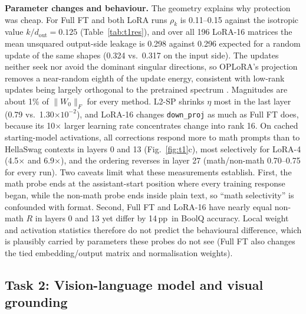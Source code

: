 \documentclass{article}
\newcommand{\pp}{\,pp}
\begin{document}
\textbf{Parameter changes and behaviour.} The geometry explains why protection was cheap. For Full FT and both LoRA runs $\rho_k$ is 0.11--0.15 against the isotropic value $k/d_\text{out}=0.125$ (Table~\ref{tab:t1res}), and over all 196 LoRA-16 matrices the mean unsquared output-side leakage is 0.298 against 0.296 expected for a random update of the same shapes (0.324 vs.\ 0.317 on the input side). The updates neither seek nor avoid the dominant singular directions, so OPLoRA's projection removes a near-random eighth of the update energy, consistent with low-rank updates being largely orthogonal to the pretrained spectrum \citep{shuttleworth2024illusion}. Magnitudes are about 1\% of $\|W_0\|_F$ for every method. L2-SP shrinks $\eta$ most in the last layer (0.79 vs.\ 1.30$\times10^{-2}$), and LoRA-16 changes \texttt{down\_proj} as much as Full FT does, because its 10$\times$ larger learning rate concentrates change into rank 16. On cached starting-model activations, all corrections respond more to math prompts than to HellaSwag contexts in layers 0 and 13 (Fig.~\ref{fig:t1}c), most selectively for LoRA-4 (4.5$\times$ and 6.9$\times$), and the ordering reverses in layer 27 (math/non-math 0.70--0.75 for every run). Two caveats limit what these measurements establish. First, the math probe ends at the assistant-start position where every training response began, while the non-math probe ends inside plain text, so ``math selectivity'' is confounded with format. Second, Full FT and LoRA-16 have nearly equal non-math $R$ in layers 0 and 13 yet differ by 14\pp\ in BoolQ accuracy. Local weight and activation statistics therefore do not predict the behavioural difference, which is plausibly carried by parameters these probes do not see (Full FT also changes the tied embedding/output matrix and normalisation weights).

\subsection{Task 2: Vision-language model and visual grounding}
\end{document}
